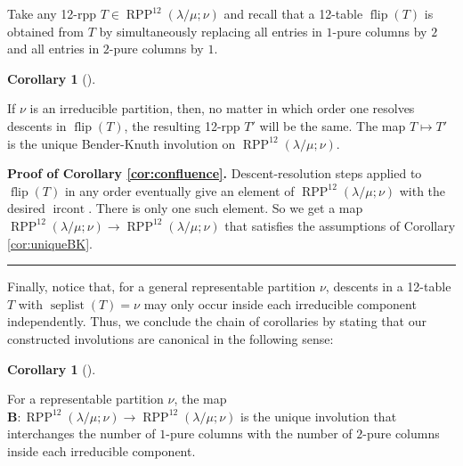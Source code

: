 \documentclass[numbers=enddot,12pt,final,onecolumn,notitlepage]{scrartcl}%
\theoremstyle{definition}
\newtheorem{coro}[theo]{Corollary}
\newenvironment{corollary}[1][]
{\begin{coro}[#1]\begin{leftbar}}
{\end{leftbar}\end{coro}}
\newenvironment{proof}[1][Proof]{\noindent\textbf{#1.} }{\ \rule{0.5em}{0.5em}}
\def\seplist{{\operatorname{seplist}}} %
\def\ircont{{\operatorname{ircont}}}
\def\seplistvar{{{\nu}}} %
\def\OneTwoRPPCutvar{{\operatorname{RPP}^{12}\left(  \lambda/\mu ;\seplistvar \right)}}
\def\flip{{\operatorname{flip}}}
\begin{document}
Take any 12-rpp $T\in\OneTwoRPPCutvar$ and recall that a 12-table $\flip(T)$ is obtained from $T$ by simultaneously replacing all entries in $1$-pure columns by $2$ and all entries in $2$-pure columns by $1$. 

\begin{corollary}
\label{cor:confluence}
 If $\seplistvar$ is an irreducible partition, then, no matter in which order one resolves descents in $\flip(T)$, the resulting 12-rpp $T'$ will be the same. The map $T\mapsto T'$ is the unique Bender-Knuth involution on $\OneTwoRPPCutvar$.
\end{corollary}
\begin{proof}[Proof of Corollary \ref{cor:confluence}]
 Descent-resolution steps applied to $\flip(T)$ in any order eventually give an element of $\OneTwoRPPCutvar$ with the desired $\ircont$. There is only one such element. So we get a map $\OneTwoRPPCutvar\to \OneTwoRPPCutvar$ that satisfies the assumptions of Corollary \ref{cor:uniqueBK}.
\end{proof}

Finally, notice that, for a general representable partition $\seplistvar$, descents in a 12-table $T$ with $\seplist(T) = \nu$ may only occur inside each irreducible component independently. Thus, we conclude the chain of corollaries by stating that our constructed involutions are canonical in the following sense:

\begin{corollary}
 For a representable partition $\nu$, the map $\mathbf{B}:\OneTwoRPPCutvar\to\OneTwoRPPCutvar$ is the unique involution that interchanges the number of $1$-pure columns with the number of $2$-pure columns inside each irreducible component.
\end{corollary}
\end{document}
